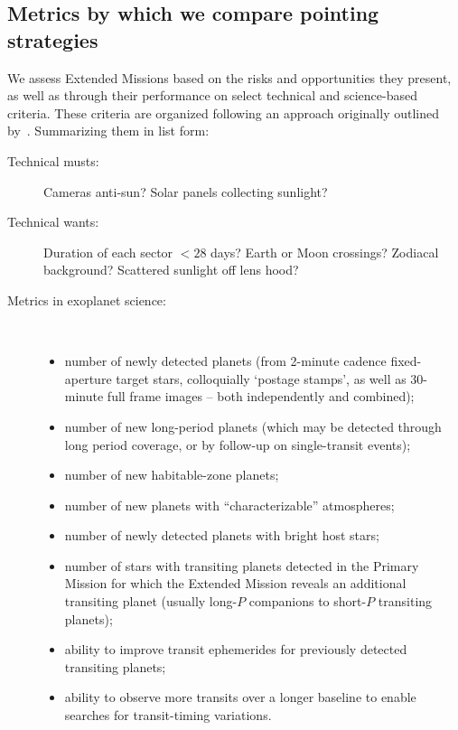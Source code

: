 \subsection{Metrics by which we compare pointing strategies}
\label{sec:comparing_pointing_strategies}

We assess Extended Missions based on the risks and opportunities they
present, as well as through their performance on select technical and
science-based criteria.  These criteria are organized following an
approach originally outlined by~\citet{kepner_rational_1965}.
Summarizing them in list form:
\begin{description}
\item[Technical musts:] Cameras anti-sun? Solar panels collecting sunlight?
\item[Technical wants:] Duration of each sector $<28$ days? Earth or Moon crossings? Zodiacal background? Scattered sunlight off lens hood?
\item[Metrics in exoplanet science:]\
	\begin{itemize}
	\item number of newly detected planets (from 2-minute cadence fixed-aperture target stars, colloquially `postage stamps', as well as 30-minute full frame images -- both independently and combined); 
	\item number of new long-period planets (which may be detected through long period coverage, or by follow-up on single-transit events); 
	\item number of new habitable-zone planets; 
	\item number of new planets with ``characterizable'' atmospheres; 
	\item number of newly detected planets with bright host stars; 
	\item number of stars with transiting planets detected in the Primary Mission for which the Extended Mission reveals an additional
          transiting planet (usually long-$P$ companions to short-$P$ transiting planets);
        \item ability to improve transit ephemerides for previously detected transiting planets;
	\item ability to observe more transits over a longer baseline to enable searches for transit-timing variations.
        \end{itemize}
\end{description}

